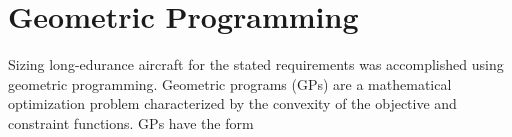 % 
% 
% 
% 

\section{Geometric Programming}

Sizing long-edurance aircraft for the stated requirements was accomplished using geometric programming. 
Geometric programs (GPs) are a mathematical optimization problem characterized by the convexity of the objective and constraint functions.\cite{gp} GPs have the form

